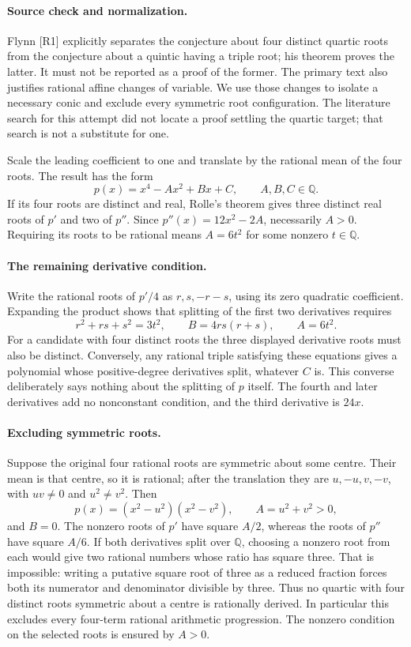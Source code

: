 \documentclass[11pt,a4paper]{article}
\begin{document}
\paragraph{Source check and normalization.}
Flynn [R1] explicitly separates the conjecture about four distinct
quartic roots from the conjecture about a quintic having a triple root;
his theorem proves the latter. It must not be reported as a proof of
the former. The primary text also justifies rational affine changes
of variable. We use those changes to isolate a necessary conic and
exclude every symmetric root configuration. The literature search for
this attempt did not locate a proof settling the quartic target;
that search is not a substitute for one.

Scale the leading coefficient to one and translate by the rational
mean of the four roots. The result has the form
\[
                 p(x)=x^4-Ax^2+Bx+C,\qquad A,B,C\in\mathbb Q.
\]
If its four roots are distinct and real, Rolle's theorem gives three
distinct real roots of $p'$ and two of $p''$. Since
$p''(x)=12x^2-2A$, necessarily $A>0$. Requiring its roots to be rational
means $A=6t^2$ for some nonzero $t\in\mathbb Q$.

\paragraph{The remaining derivative condition.}
Write the rational roots of $p'/4$ as $r,s,-r-s$, using its zero
quadratic coefficient. Expanding the product shows that splitting of
the first two derivatives requires
\[
 r^2+rs+s^2=3t^2,\qquad B=4rs(r+s),\qquad A=6t^2.
\]
For a candidate with four distinct roots the three displayed derivative
roots must also be distinct. Conversely, any rational triple satisfying
these equations gives a polynomial whose positive-degree derivatives
split, whatever $C$ is. This converse deliberately says nothing about
the splitting of $p$ itself. The fourth and later derivatives add no
nonconstant condition, and the third derivative is $24x$.

\paragraph{Excluding symmetric roots.}
Suppose the original four rational roots are symmetric about some
centre. Their mean is that centre, so it is rational; after the
translation they are $u,-u,v,-v$, with $uv\ne0$ and $u^2\ne v^2$.
Then
\[
 p(x)=(x^2-u^2)(x^2-v^2),\qquad A=u^2+v^2>0,
\]
and $B=0$. The nonzero roots of $p'$ have square $A/2$, whereas the
roots of $p''$ have square $A/6$. If both derivatives split over
$\mathbb Q$, choosing a nonzero root from each would give two rational
numbers whose ratio has square three. That is impossible: writing a
putative square root of three as a reduced fraction forces both its
numerator and denominator divisible by three. Thus no quartic with
four distinct roots symmetric about a centre is rationally derived.
In particular this excludes every four-term rational arithmetic
progression. The nonzero condition on the selected roots is ensured
by $A>0$.
\end{document}
